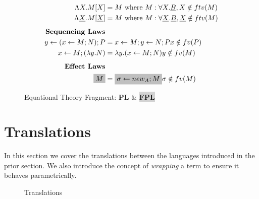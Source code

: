 \documentclass[acmsmall]{acmart}
\newcommand{\den}[1]{\llbracket #1\rrbracket}
\newcommand{\pl}{$\mathbf{PL}$}
\newcommand{\fpl}{$\mathbf{FPL}$}
\begin{document}
\begin{figure}[!htbp]
\begin{minipage}[t]{0.48\textwidth}
\[\begin{aligned}
      \Lambda X. M[X] &= M  \text{ where } M : \forall X. \underline{B}, X \notin ftv(M)\\
      \Lambda \underline{X}. M[\underline{X}] &= M  \text{ where } M : \forall \underline{X}. \underline{B}, \underline{X} \notin ftv(M)\\[1ex]
      \textbf{Sequencing Laws}& \\
      y \leftarrow (x \leftarrow M;N); P &= x \leftarrow M; y \leftarrow N; P  x \notin fv(P)\\
      x \leftarrow M; (\lambda y . N) &= \lambda y. (x\leftarrow M; N)  y\notin fv(M)\\[1ex]
      \textbf{Effect Laws}& \\
      \colorbox{lightgray}{$M$} &= \colorbox{lightgray}{$\sigma \leftarrow new_A; M$}  \sigma \notin fv(M)
    \end{aligned}
    \]
  \end{minipage}
  \caption{Equational Theory Fragment: \pl \; \& \colorbox{lightgray}{\fpl}}
  \label{fig:EquationalTheory}
\end{figure}




    

\section{Translations}\label{sec:Translations}
In this section we cover the translations between the languages introduced in the prior section. We also introduce the concept of \emph{wrapping} a term to ensure it behaves parametrically.
\begin{figure}[H]
  \centering
  \caption{Translations}
  \label{fig:translations}
\end{figure}
\end{document}
